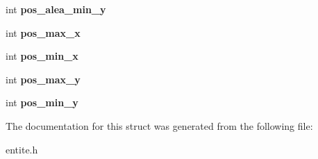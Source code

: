 \begin{DoxyCompactItemize}
\item 
\mbox{\label{structent_aef1b031dc8b230ae3a0758026a6d38ac}} 
int {\bfseries pos\+\_\+alea\+\_\+min\+\_\+y}
\item 
\mbox{\label{structent_a5b94401696ef3efa501b6c385002c9ec}} 
int {\bfseries pos\+\_\+max\+\_\+x}
\item 
\mbox{\label{structent_a09b9e9e59a320783defabfc9b2b13472}} 
int {\bfseries pos\+\_\+min\+\_\+x}
\item 
\mbox{\label{structent_a7484c8e1151a8213da135da607777b70}} 
int {\bfseries pos\+\_\+max\+\_\+y}
\item 
\mbox{\label{structent_a732ef8e99756713622fb859d06c2ba9d}} 
int {\bfseries pos\+\_\+min\+\_\+y}
\end{DoxyCompactItemize}


The documentation for this struct was generated from the following file\+:\begin{DoxyCompactItemize}
\item 
entite.\+h\end{DoxyCompactItemize}
